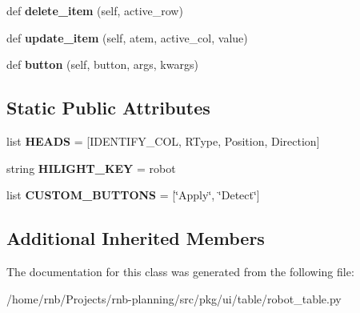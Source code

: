 \begin{DoxyCompactItemize}
def {\bfseries delete\+\_\+item} (self, active\+\_\+row)
\item 
\mbox{\label{classrnb-planning_1_1src_1_1pkg_1_1ui_1_1table_1_1robot__table_1_1_robot_table_a1e381839202f3dd8744d88d9083335be}} 
def {\bfseries update\+\_\+item} (self, atem, active\+\_\+col, value)
\item 
\mbox{\label{classrnb-planning_1_1src_1_1pkg_1_1ui_1_1table_1_1robot__table_1_1_robot_table_a9f5ec510d5138ba10957ae00a46b720a}} 
def {\bfseries button} (self, button, args, kwargs)
\end{DoxyCompactItemize}
\subsection*{Static Public Attributes}
\begin{DoxyCompactItemize}
\item 
\mbox{\label{classrnb-planning_1_1src_1_1pkg_1_1ui_1_1table_1_1robot__table_1_1_robot_table_a38aa876ac734c98ccf7aa1b6e341a8c0}} 
list {\bfseries H\+E\+A\+DS} = \mbox{[}I\+D\+E\+N\+T\+I\+F\+Y\+\_\+\+C\+OL, \textquotesingle{}R\+Type\textquotesingle{}, \textquotesingle{}Position\textquotesingle{}, \textquotesingle{}Direction\textquotesingle{}\mbox{]}
\item 
\mbox{\label{classrnb-planning_1_1src_1_1pkg_1_1ui_1_1table_1_1robot__table_1_1_robot_table_ac0faf55bbbfc2225b67c9873817f992f}} 
string {\bfseries H\+I\+L\+I\+G\+H\+T\+\_\+\+K\+EY} = \textquotesingle{}robot\textquotesingle{}
\item 
\mbox{\label{classrnb-planning_1_1src_1_1pkg_1_1ui_1_1table_1_1robot__table_1_1_robot_table_aaaf6274a2b5a8db1438426069d25f9bf}} 
list {\bfseries C\+U\+S\+T\+O\+M\+\_\+\+B\+U\+T\+T\+O\+NS} = \mbox{[}\char`\"{}Apply\char`\"{}, \char`\"{}Detect\char`\"{}\mbox{]}
\end{DoxyCompactItemize}
\subsection*{Additional Inherited Members}


The documentation for this class was generated from the following file\+:\begin{DoxyCompactItemize}
\item 
/home/rnb/\+Projects/rnb-\/planning/src/pkg/ui/table/robot\+\_\+table.\+py\end{DoxyCompactItemize}
